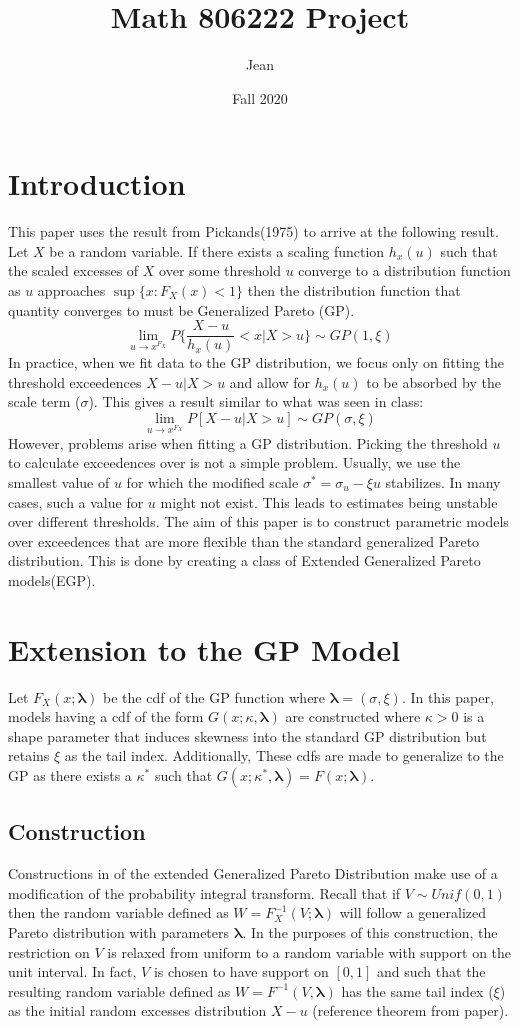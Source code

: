 \documentclass{article}
\title{Math 806222 Project}
\author{Jean }
\date{Fall 2020}
\theoremstyle{definition}
\theoremstyle{definition}
\def\lam{\boldsymbol{\lambda}}
\def\k{\kappa}
\begin{document}
\maketitle
\tableofcontents{}
\pagebreak
\section{Introduction}
This paper uses the result from Pickands(1975) to arrive at the following result. Let $X$ be a random variable. If there exists a scaling function $h_x(u)$ such that the scaled excesses of $X$ over some threshold $u$ converge to a distribution function as $u$ approaches $\sup\{x:F_X(x)<1\}$ then the distribution function that quantity converges to must be Generalized Pareto (GP).
\[\lim_{u\rightarrow x^{F_X}} P\bigg\{\frac{X-u}{h_x(u)}<x|X>u \bigg\}\sim GP(1,\xi)\]
In practice, when we fit data to the GP distribution, we focus only on fitting the threshold exceedences $X-u|X>u$ and allow for $h_x(u)$ to be absorbed by the scale term ($\sigma$). This gives a result similar to what was seen in class:
\[ \lim_{u\rightarrow x^{F_X}} P[X-u|X>u]\sim GP(\sigma, \xi)\]
However, problems arise when fitting a GP distribution. Picking the threshold $u$ to calculate exceedences over is not a simple problem. Usually, we use the smallest value of $u$ for which the modified scale $\sigma^*=\sigma_u-\xi u$ stabilizes. In many cases, such a value for $u$ might not exist. This leads to estimates being unstable over different thresholds. The aim of this paper is to construct parametric models over exceedences that are more flexible than the standard generalized Pareto distribution. This is done by creating a class of Extended Generalized Pareto models(EGP).

\section{Extension to the GP Model}
Let $F_X(x;\lam)$ be the cdf of the GP function where $\lam=(\sigma, \xi)$. In this paper, models having a cdf of the form $G(x;\k,\lam)$ are constructed where $\k>0$ is a shape parameter that induces skewness into the standard GP distribution but retains $\xi$ as the tail index. Additionally, These cdfs are made to generalize to the GP as there exists a $\k^*$ such that $G(x;\k^*,\lam)= F(x;\lam)$.
\subsection{Construction}
Constructions in of the extended Generalized Pareto Distribution make use of a modification of the probability integral transform. Recall that if $V\sim Unif(0,1)$ then the random variable defined as $W=F_X^{-1}(V;\lam)$ will follow a generalized Pareto distribution with parameters $\lam$. In the purposes of this construction, the restriction on $V$ is relaxed from uniform to a random variable with support on the unit interval. In fact, $V$ is chosen to have support on $[0,1]$ and such that the resulting random variable defined as $W=F^{-1}(V,\lam)$ has the same tail index ($\xi$) as the initial random excesses distribution $X-u$ (reference theorem from paper).
\end{document}
